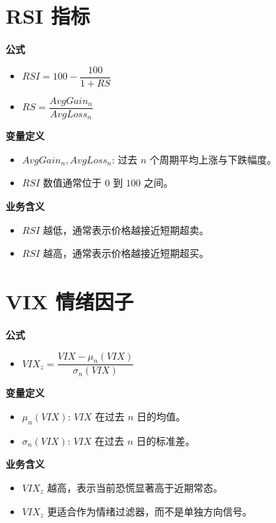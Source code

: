 \documentclass[11pt,a4paper]{ctexart}
\begin{document}
\section*{RSI 指标}
\textbf{公式}
\begin{itemize}
\item $RSI=100-\dfrac{100}{1+RS}$
\item $RS=\dfrac{AvgGain_n}{AvgLoss_n}$
\end{itemize}
\textbf{变量定义}
\begin{itemize}
\item $AvgGain_n, AvgLoss_n$: 过去 $n$ 个周期平均上涨与下跌幅度。
\item $RSI$ 数值通常位于 $0$ 到 $100$ 之间。
\end{itemize}
\textbf{业务含义}
\begin{itemize}
\item $RSI$ 越低，通常表示价格越接近短期超卖。
\item $RSI$ 越高，通常表示价格越接近短期超买。
\end{itemize}

\section*{VIX 情绪因子}
\textbf{公式}
\begin{itemize}
\item $VIX_z=\dfrac{VIX-\mu_n(VIX)}{\sigma_n(VIX)}$
\end{itemize}
\textbf{变量定义}
\begin{itemize}
\item $\mu_n(VIX)$: $VIX$ 在过去 $n$ 日的均值。
\item $\sigma_n(VIX)$: $VIX$ 在过去 $n$ 日的标准差。
\end{itemize}
\textbf{业务含义}
\begin{itemize}
\item $VIX_z$ 越高，表示当前恐慌显著高于近期常态。
\item $VIX_z$ 更适合作为情绪过滤器，而不是单独方向信号。
\end{itemize}
\end{document}
